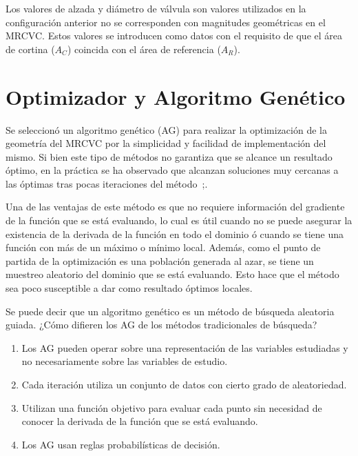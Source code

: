 Los valores de alzada y diámetro de válvula son valores utilizados en la
configuración anterior no se corresponden con magnitudes geométricas en el
MRCVC.
%
Estos valores se introducen como datos con el requisito de que el área de
cortina ($A_{C}$) coincida con el área de referencia ($A_{R}$).



\section{Optimizador y Algoritmo Genético}
%
%

Se seleccionó un algoritmo genético (AG) para realizar la optimización de la
geometría del MRCVC por la simplicidad y facilidad de implementación del mismo.
%
Si bien este tipo de métodos no garantiza que se alcance un resultado óptimo,
en la práctica se ha observado que alcanzan soluciones muy cercanas a las
óptimas tras pocas iteraciones del método~\parencite{goldberg};\parencite{shi}.

Una de las ventajas de este método es que no requiere información del gradiente
de la función que se está evaluando, lo cual es útil cuando no se puede asegurar
la existencia de la derivada de la función en todo el dominio ó cuando se tiene
una función con más de un máximo o mínimo local.
%
Además, como el punto de partida de la optimización es una población generada al
azar, se tiene un muestreo aleatorio del dominio que se está evaluando.
%
Esto hace que el método sea poco susceptible a dar como resultado óptimos
locales.

Se puede decir que un algoritmo genético es un método de búsqueda aleatoria
guiada.
%
¿Cómo difieren los AG de los métodos tradicionales de búsqueda?
%
\begin{enumerate}
  \item Los AG pueden operar sobre una representación de las variables estudiadas y
no necesariamente sobre las variables de estudio.
  \item Cada iteración utiliza un conjunto de datos con cierto grado de
aleatoriedad.
  \item Utilizan una función objetivo para evaluar cada punto sin necesidad de
conocer la derivada de la función que se está evaluando.
  \item Los AG usan reglas probabilísticas de decisión.
\end{enumerate}


